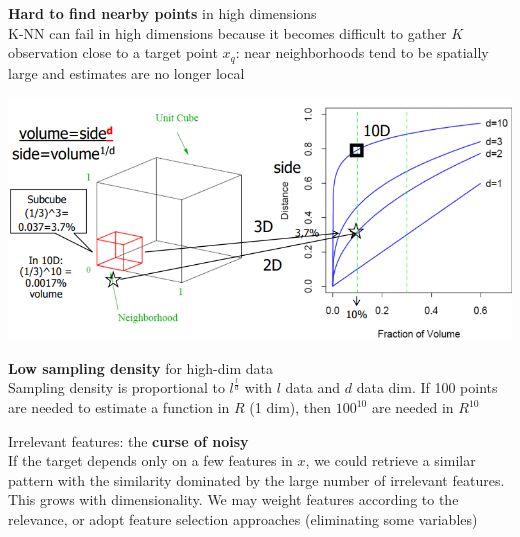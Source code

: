 \documentclass[10pt]{report}
\begin{document}
\begin{list}{}{}
	\item \textbf{Hard to find nearby points} in high dimensions\\
	K-NN can fail in high dimensions because it becomes difficult to gather $K$ observation close to a target point $x_q$: near neighborhoods tend to be spatially large and estimates are no longer local
	\begin{center}
		\includegraphics[scale=0.75]{5.png}
	\end{center}
	\item \textbf{Low sampling density} for high-dim data\\
	Sampling density is proportional to $l^{\frac{l}{d}}$ with $l$ data and $d$ data dim. If 100 points are needed to estimate a function in $R$ (1 dim), then $100^{10}$ are needed in $R^{10}$
	\item Irrelevant features: the \textbf{curse of noisy}\\
	If the target depends only on a few features in $x$, we could retrieve a similar pattern with the similarity dominated by the large number of irrelevant features. This grows with dimensionality. We may weight features according to the relevance, or adopt feature selection approaches (eliminating some variables)
\end{list}
\pagebreak
\end{document}
